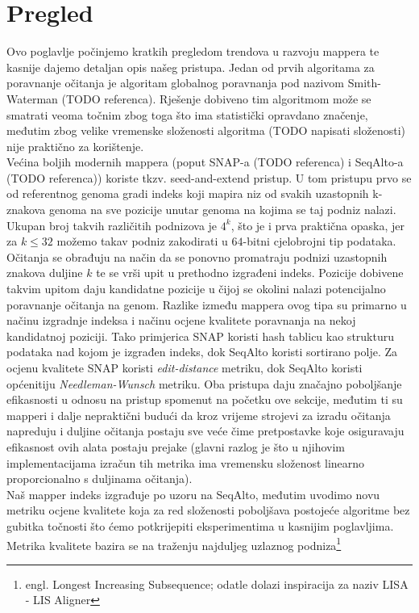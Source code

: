 \documentclass[times, utf8, diplomski]{fer}
\begin{document}
\section{Pregled}
Ovo poglavlje počinjemo kratkih pregledom trendova u razvoju mappera te kasnije dajemo detaljan opis našeg pristupa. Jedan od prvih algoritama za poravnanje očitanja je algoritam globalnog poravnanja pod nazivom Smith-Waterman (TODO referenca). Rješenje dobiveno tim algoritmom može se smatrati veoma točnim zbog toga što ima statistički opravdano značenje, međutim zbog velike vremenske složenosti algoritma (TODO napisati složenosti) nije praktično za korištenje.\\
Većina boljih modernih mappera (poput SNAP-a (TODO referenca) i SeqAlto-a (TODO referenca)) koriste tkzv. seed-and-extend pristup. U tom pristupu prvo se od referentnog genoma gradi indeks koji mapira niz od svakih uzastopnih k-znakova genoma na sve pozicije unutar genoma na kojima se taj podniz nalazi. Ukupan broj takvih različitih podnizova je $4^k$, što je i prva praktična opaska, jer za $k\le32$ možemo takav podniz zakodirati u $64$-bitni cjelobrojni tip podataka. Očitanja se obrađuju na način da se ponovno promatraju podnizi uzastopnih znakova duljine $k$ te se vrši upit u prethodno izgrađeni indeks. Pozicije dobivene takvim upitom daju kandidatne pozicije u čijoj se okolini nalazi potencijalno poravnanje očitanja na genom. Razlike između mappera ovog tipa su primarno u načinu izgradnje indeksa i načinu ocjene kvalitete poravnanja na nekoj kandidatnoj poziciji. Tako primjerica SNAP koristi hash tablicu kao strukturu podataka nad kojom je izgrađen indeks, dok SeqAlto koristi sortirano polje. Za ocjenu kvalitete SNAP koristi \emph{edit-distance} metriku, dok SeqAlto koristi općenitiju \emph{Needleman-Wunsch} metriku. Oba pristupa daju značajno poboljšanje efikasnosti u odnosu na pristup spomenut na početku ove sekcije, međutim ti su mapperi i dalje nepraktični budući da kroz vrijeme strojevi za izradu očitanja napreduju i duljine očitanja postaju sve veće čime pretpostavke koje osiguravaju efikasnost ovih alata postaju prejake (glavni razlog je što u njihovim implementacijama izračun tih metrika ima vremensku složenost linearno proporcionalno s duljinama očitanja).\\
Naš mapper indeks izgrađuje po uzoru na SeqAlto, međutim uvodimo novu metriku ocjene kvalitete koja za red složenosti poboljšava postojeće algoritme bez gubitka točnosti što ćemo potkrijepiti eksperimentima u kasnijim poglavljima.
Metrika kvalitete bazira se na traženju najduljeg uzlaznog podniza\footnote{engl. Longest Increasing Subsequence; odatle dolazi inspiracija za naziv LISA - LIS Aligner}\\
\end{document}
